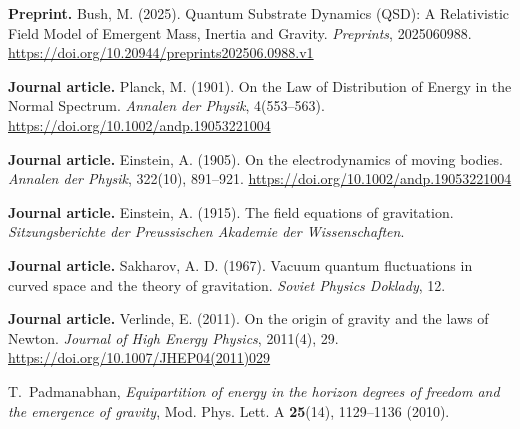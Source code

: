 \documentclass[ht-mathphys]{ht-fmt}
\theoremstyle{thmstyleone}%
\theoremstyle{thmstyletwo}%
\theoremstyle{thmstylethree}%
\begin{document}


%


\clearpage
\begin{thebibliography}{99}

\textbf{Preprint.} Bush, M. (2025). Quantum Substrate Dynamics (QSD): A Relativistic Field Model of Emergent Mass, Inertia and Gravity. \textit{Preprints}, 2025060988. \url{https://doi.org/10.20944/preprints202506.0988.v1}

\textbf{Journal article.} Planck, M. (1901). On the Law of Distribution of Energy in the Normal Spectrum. \textit{Annalen der Physik}, 4(553–563). \url{https://doi.org/10.1002/andp.19053221004}

\textbf{Journal article.} Einstein, A. (1905). On the electrodynamics of moving bodies. \textit{Annalen der Physik}, 322(10), 891–921. \url{https://doi.org/10.1002/andp.19053221004}

\textbf{Journal article.} Einstein, A. (1915). The field equations of gravitation. \textit{Sitzungsberichte der Preussischen Akademie der Wissenschaften}.

\textbf{Journal article.} Sakharov, A. D. (1967). Vacuum quantum fluctuations in curved space and the theory of gravitation. \textit{Soviet Physics Doklady}, 12.

\textbf{Journal article.} Verlinde, E. (2011). On the origin of gravity and the laws of Newton. \textit{Journal of High Energy Physics}, 2011(4), 29. \url{https://doi.org/10.1007/JHEP04(2011)029}

T.~Padmanabhan, 
\emph{Equipartition of energy in the horizon degrees of freedom and the emergence of gravity}, 
Mod. Phys. Lett. A \textbf{25}(14), 1129–1136 (2010).


\end{thebibliography}
\end{document}
